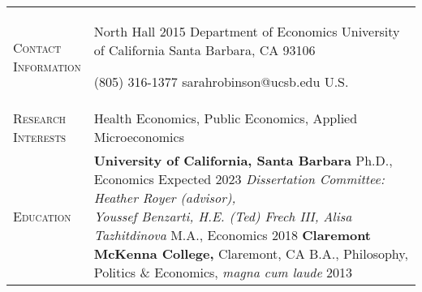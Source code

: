 \documentclass[11pt]{article}
\begin{document}
\begin{tabularx}{\textwidth}{@{}Y Z@{}}
	
	
	\textsc{Contact \newline Information} & 
	\begin{minipage}[t]{0.35\textwidth}
		North Hall 2015 \newline
		Department of Economics \newline
		University of California \newline
		Santa Barbara, CA 93106
	\end{minipage}\begin{minipage}[t]{0.4\textwidth}
	 (805) 316-1377 \newline
	 sarahrobinson@ucsb.edu \newline
	 \href{https://www.s-robinson.com}{\color{blue}{www.s-robinson.com}} \newline
	 U.S.
\end{minipage}
	\newline \\[15pt]
	
	\textsc{Research \newline Interests} \vspace{20pt} & 
	Health Economics, Public Economics, Applied Microeconomics
	\\[15pt]
	
	
	\textsc{Education} \vspace{20pt} &
	\textbf{University of California, Santa Barbara}
	\vspace{3pt} \newline
	\hspace*{15pt} Ph.D., Economics \hfill Expected 2023
	\vspace{3pt} \newline
	\hspace*{15pt} \textit{Dissertation Committee: Heather Royer (advisor), \newline \hspace*{15pt} Youssef Benzarti, H.E. (Ted) Frech III, Alisa Tazhitdinova} 
	\vspace{10pt} \newline
	\hspace*{15pt} M.A., Economics \hfill 2018
	\vspace{15pt} \newline
	\textbf{Claremont McKenna College,} Claremont, CA 
	\vspace{3pt} \newline
	\hspace*{15pt} B.A., Philosophy, Politics \& Economics, \textit{magna cum laude} \hfill 2013
	\vspace{0pt}
	\\[20pt]



\end{tabularx}
\end{document}
